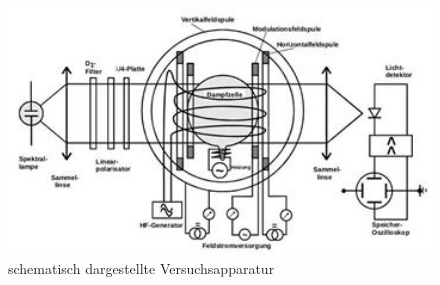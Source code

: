  \begin{figure}[H]
	\centering
	\includegraphics[width=12cm]{aufbau.jpg}
	\caption{schematisch dargestellte Versuchsapparatur \cite{V21}}
	\label{abb:aufbau}
\end{figure}
